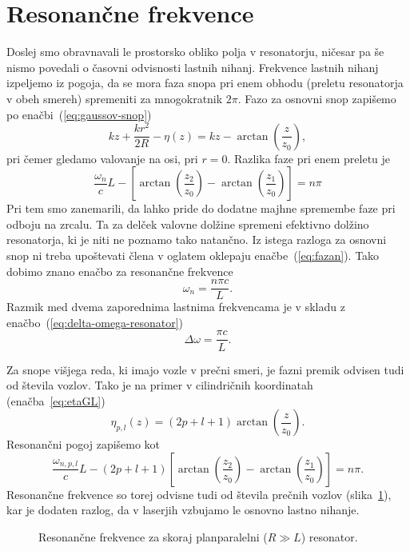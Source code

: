 \section{Resonančne frekvence}
Doslej smo obravnavali le prostorsko obliko polja v resonatorju, ničesar pa še nismo
povedali o časovni odvisnosti lastnih nihanj. Frekvence
lastnih nihanj izpeljemo iz pogoja, 
da se mora faza snopa pri enem obhodu
(preletu resonatorja v obeh smereh) spremeniti za mnogokratnik
$2\pi$. Fazo za osnovni snop zapišemo po enačbi~(\ref{eq:gaussov-snop})
\begin{equation}
kz+\frac{kr^{2}}{2R} -\eta(z) = kz-\arctan \left(\frac{z}{z_{0}}\right),
\label{eq:fazag}
\end{equation}
pri čemer  gledamo valovanje na osi, pri $r=0$. 
Razlika faze pri enem preletu je 
\begin{equation}
\frac{\omega_{n}}{c}L-\left[\arctan \left(\frac{z_{2}}{z_{0}}\right)-
\arctan\left(\frac{z_{1}}{z_{0}}\right)\right]=n\pi
\label{eq:fazan}
\end{equation}
Pri tem smo zanemarili, da lahko pride do dodatne majhne spremembe
faze pri odboju na zrcalu. Ta za delček valovne dolžine
spremeni efektivno dolžino resonatorja, ki je niti ne poznamo
tako natančno. Iz istega razloga za osnovni snop ni treba upoštevati člena
v oglatem oklepaju enačbe~(\ref{eq:fazan}). Tako dobimo znano enačbo za resonančne frekvence 
\begin{equation}
\omega_{n}=\frac{n\pi c}{L}.
\label{eq:omega}
\end{equation}
Razmik med dvema zaporednima lastnima frekvencama je v skladu z enačbo~(\ref{eq:delta-omega-resonator})
\begin{equation}
\Delta\omega=\frac{\pi c}{L}.
\label{eq:deltaomega}
\end{equation}

Za snope višjega reda, ki imajo vozle v prečni smeri, je fazni premik
odvisen tudi od števila vozlov. Tako je na primer v cilindričnih koordinatah
(enačba~\ref{eq:etaGL})
\begin{equation}
\eta_{p,l}(z)=(2p+l+1)\arctan\left(\frac{z}{z_{0}}\right).
\end{equation}
Resonančni pogoj zapišemo kot
\begin{equation}
\frac{\omega_{n,p,l}}{c}L-(2p+l+1)\left[\arctan\left(\frac{z_{2}}{z_{0}}\right)-
\arctan\left(\frac{z_{1}}{z_{0}}\right)\right]=n\pi.
\end{equation}
Resonančne frekvence so torej odvisne tudi od števila prečnih vozlov (slika~\ref{fig:crte}),
kar je dodaten razlog, da v laserjih vzbujamo le osnovno lastno nihanje.
\begin{figure}[h]
\centering
\def\svgwidth{90truemm} 

\caption{Resonančne frekvence za skoraj planparalelni ($R\gg L$) resonator.}
\label{fig:crte}
\end{figure}

